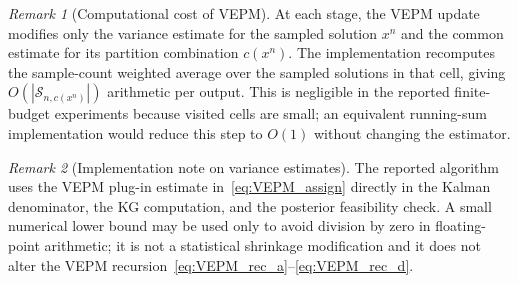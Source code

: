 \documentclass[12pt]{article}
\theoremstyle{plain}
\theoremstyle{definition}
\theoremstyle{remark}
\newtheorem{remark}{Remark}[section]
\begin{document}
\begin{remark}[Computational cost of VEPM]\label{rem:VEPM_cost}
At each stage, the VEPM update modifies only the variance estimate for the sampled solution $x^n$ and the common estimate for its partition combination $c(x^n)$.  The implementation recomputes the sample-count weighted average over the sampled solutions in that cell, giving $O(|\mathcal{S}_{n,c(x^n)}|)$ arithmetic per output.  This is negligible in the reported finite-budget experiments because visited cells are small; an equivalent running-sum implementation would reduce this step to $O(1)$ without changing the estimator.
\end{remark}

\begin{remark}[Implementation note on variance estimates]\label{rem:variance_implementation}
The reported algorithm uses the VEPM plug-in estimate in~\eqref{eq:VEPM_assign} directly in the Kalman denominator, the KG computation, and the posterior feasibility check.  A small numerical lower bound may be used only to avoid division by zero in floating-point arithmetic; it is not a statistical shrinkage modification and it does not alter the VEPM recursion~\eqref{eq:VEPM_rec_a}--\eqref{eq:VEPM_rec_d}.
\end{remark}
\end{document}
